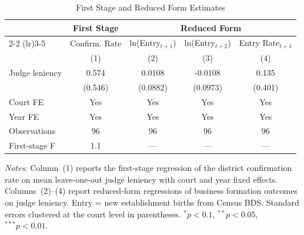 \begin{table}[htbp]
\centering
\caption{First Stage and Reduced Form Estimates}
\label{tab:first_stage}
\begin{threeparttable}
\begin{tabular}{lcccc}
\toprule
 & First Stage & \multicolumn{3}{c}{Reduced Form} \\
\cmidrule(lr){2-2} \cmidrule(lr){3-5}
 & Confirm. Rate & ln(Entry$_{t+1}$) & ln(Entry$_{t+2}$) & Entry Rate$_{t+1}$ \\
 & (1) & (2) & (3) & (4) \\
\midrule
Judge leniency & 0.574 & 0.0108 & -0.0108 & 0.135 \\
 & (0.546) & (0.0882) & (0.0973) & (0.401) \\
\midrule
Court FE & Yes & Yes & Yes & Yes \\
Year FE & Yes & Yes & Yes & Yes \\
Observations & 96 & 96 & 96 & 96 \\
First-stage F & 1.1 & --- & --- & --- \\
\bottomrule
\end{tabular}
\begin{tablenotes}
\small
\item \textit{Notes:} Column~(1) reports the first-stage regression of the district confirmation rate on mean leave-one-out judge leniency with court and year fixed effects. Columns~(2)--(4) report reduced-form regressions of business formation outcomes on judge leniency. Entry = new establishment births from Census BDS. Standard errors clustered at the court level in parentheses. $^{*}p<0.1$, $^{**}p<0.05$, $^{***}p<0.01$.
\end{tablenotes}
\end{threeparttable}
\end{table}
